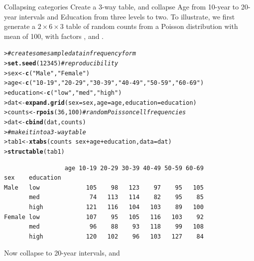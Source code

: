 \documentclass[10pt,krantz2]{krantz}\usepackage[]{graphicx}\usepackage[]{color}
\makeatletter
\newcommand{\hlnum}[1]{\textcolor[rgb]{0.686,0.059,0.569}{#1}}%
\newcommand{\hlstr}[1]{\textcolor[rgb]{0.192,0.494,0.8}{#1}}%
\newcommand{\hlcom}[1]{\textcolor[rgb]{0.678,0.584,0.686}{\textit{#1}}}%
\newcommand{\hlopt}[1]{\textcolor[rgb]{0,0,0}{#1}}%
\newcommand{\hlstd}[1]{\textcolor[rgb]{0.345,0.345,0.345}{#1}}%
\newcommand{\hlkwb}[1]{\textcolor[rgb]{0.69,0.353,0.396}{#1}}%
\newcommand{\hlkwc}[1]{\textcolor[rgb]{0.333,0.667,0.333}{#1}}%
\newcommand{\hlkwd}[1]{\textcolor[rgb]{0.737,0.353,0.396}{\textbf{#1}}}%
\newenvironment{kframe}{%
 \def\at@end@of@kframe{}%
 \ifinner\ifhmode%
  \def\at@end@of@kframe{\end{minipage}}%
  \begin{minipage}{\columnwidth}%
 \fi\fi%
 \def\FrameCommand##1{\hskip\@totalleftmargin \hskip-\fboxsep
 \colorbox{shadecolor}{##1}\hskip-\fboxsep
     \hskip-\linewidth \hskip-\@totalleftmargin \hskip\columnwidth}%
 \MakeFramed {\advance\hsize-\width
   \@totalleftmargin\z@ \linewidth\hsize
   \@setminipage}}%
 {\par\unskip\endMakeFramed%
 \at@end@of@kframe}
\newenvironment{knitrout}{}{} %
\renewenvironment{knitrout}{\small\renewcommand{\baselinestretch}{.85}}{} %
\makeatother
\begin{document}
\begin{Example}{Collapsing categories}
Create a 3-way table, and collapse Age from 10-year to 20-year intervals
and Education from three levels to two.
To illustrate, we first generate a $2 \times 6 \times 3$ table of random counts from a
Poisson distribution with mean of 100, with factors , 
and .
\begin{knitrout}
\color{fgcolor}\begin{kframe}
\begin{alltt}
\hlstd{> }\hlcom{# create some sample data in frequency form}
\hlstd{> }\hlkwd{set.seed}\hlstd{(}\hlnum{12345}\hlstd{)}   \hlcom{# reproducibility}
\hlstd{> }\hlstd{sex} \hlkwb{<-} \hlkwd{c}\hlstd{(}\hlstr{"Male"}\hlstd{,} \hlstr{"Female"}\hlstd{)}
\hlstd{> }\hlstd{age} \hlkwb{<-} \hlkwd{c}\hlstd{(}\hlstr{"10-19"}\hlstd{,} \hlstr{"20-29"}\hlstd{,}  \hlstr{"30-39"}\hlstd{,} \hlstr{"40-49"}\hlstd{,} \hlstr{"50-59"}\hlstd{,} \hlstr{"60-69"}\hlstd{)}
\hlstd{> }\hlstd{education} \hlkwb{<-} \hlkwd{c}\hlstd{(}\hlstr{"low"}\hlstd{,} \hlstr{"med"}\hlstd{,} \hlstr{"high"}\hlstd{)}
\hlstd{> }\hlstd{dat} \hlkwb{<-} \hlkwd{expand.grid}\hlstd{(}\hlkwc{sex} \hlstd{= sex,} \hlkwc{age} \hlstd{= age,} \hlkwc{education} \hlstd{= education)}
\hlstd{> }\hlstd{counts} \hlkwb{<-} \hlkwd{rpois}\hlstd{(}\hlnum{36}\hlstd{,} \hlnum{100}\hlstd{)}   \hlcom{# random Poisson cell frequencies}
\hlstd{> }\hlstd{dat} \hlkwb{<-} \hlkwd{cbind}\hlstd{(dat, counts)}
\hlstd{> }\hlcom{# make it into a 3-way table}
\hlstd{> }\hlstd{tab1} \hlkwb{<-} \hlkwd{xtabs}\hlstd{(counts} \hlopt{~} \hlstd{sex} \hlopt{+} \hlstd{age} \hlopt{+} \hlstd{education,} \hlkwc{data} \hlstd{= dat)}
\hlstd{> }\hlkwd{structable}\hlstd{(tab1)}
\end{alltt}
\begin{verbatim}
                 age 10-19 20-29 30-39 40-49 50-59 60-69
sex    education                                        
Male   low             105    98   123    97    95   105
       med              74   113   114    82    95    85
       high            121   116   104   103    89   100
Female low             107    95   105   116   103    92
       med              96    88    93   118    99   108
       high            120   102    96   103   127    84
\end{verbatim}
\end{kframe}
\end{knitrout}
Now collapse  to 20-year intervals, and 

\end{Example}
\end{document}
